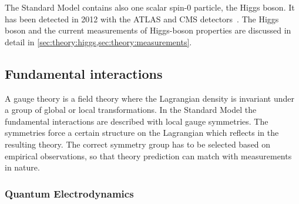 The Standard Model contains also one scalar spin-0 particle, the Higgs boson.
It has been detected in 2012 with the ATLAS and CMS detectors~\cite{HiggsDiscoveryATLAS,HiggsDiscoveryCMS}.
The Higgs boson and the current measurements of Higgs-boson properties are discussed in detail in \cref{sec:theory:higgs,sec:theory:measurements}.

\subsection{Fundamental interactions}\label{sub:theory:sm:interactions}

A gauge theory is a field theory where the Lagrangian density is invariant under a group of global or local transformations.
In the Standard Model the fundamental interactions are described with local gauge symmetries.
The symmetries force a certain structure on the Lagrangian which reflects in the resulting theory.
The correct symmetry group has to be selected based on empirical observations, so that theory prediction can match with measurements in nature.

\subsubsection{Quantum Electrodynamics}

